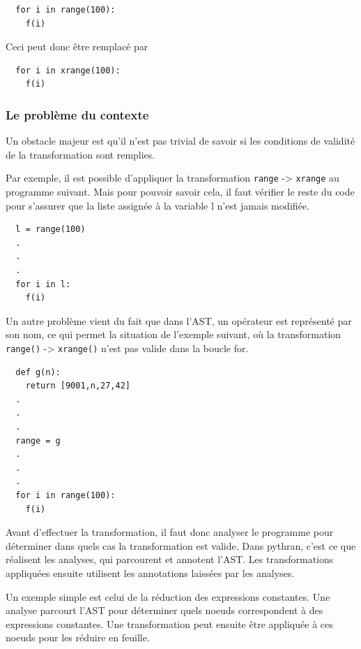 \documentclass[a4paper]{article}
\begin{document}
\begin{lstlisting}
  for i in range(100):
    f(i)
\end{lstlisting}

Ceci peut donc être remplacé par

\begin{lstlisting}
  for i in xrange(100):
    f(i)
\end{lstlisting}

\subsubsection{Le problème du contexte}

Un obstacle majeur est qu'il n'est pas trivial de savoir si les
conditions de validité de la transformation sont remplies.

Par exemple, il est possible d'appliquer la transformation \texttt{range} ->
\texttt{xrange} au programme suivant. Mais pour pouvoir savoir cela, il faut
vérifier le reste du code pour s'assurer que la liste assignée à la
variable l n'est jamais modifiée.

\begin{lstlisting}
  l = range(100)
  .
  .
  .
  for i in l:
    f(i)
\end{lstlisting}

Un autre problème vient du fait que dans l'AST, un opérateur est
représenté par son nom, ce qui permet la situation de l'exemple
suivant, où la transformation \texttt{range()} -> \texttt{xrange()} n'est pas valide
dans la boucle for.

\begin{lstlisting}
  def g(n):
    return [9001,n,27,42]
  .
  .
  .
  range = g
  .
  .
  .
  for i in range(100):
    f(i)
\end{lstlisting}

Avant d'effectuer la transformation, il faut donc analyser le
programme pour déterminer dans quels cas la transformation est
valide. Dans pythran, c'est ce que réalisent les analyses, qui
parcourent et annotent l'AST. Les transformations appliquées ensuite
utilisent les annotations laissées par les analyses.

Un exemple simple est celui de la réduction des expressions
constantes. Une analyse parcourt l'AST pour déterminer quels noeuds
correspondent à des expressions constantes. Une transformation peut
ensuite être appliquée à ces noeuds pour les réduire en feuille.
\end{document}
